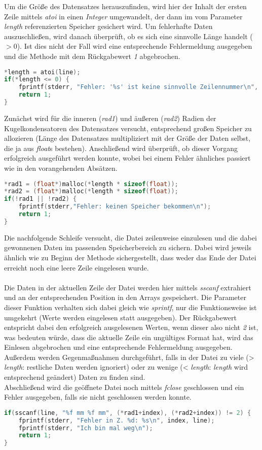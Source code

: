 \documentclass[11pt]{scrartcl}
\begin{document}
Um die Größe des Datensatzes herauszufinden, wird hier der Inhalt der ersten Zeile mittels \emph{atoi} in einen \emph{Integer} umgewandelt, der dann im vom Parameter \emph{length} referenzierten Speicher gesichert wird. Um fehlerhafte Daten auszuschließen, wird danach überprüft, ob es sich eine sinnvolle Länge handelt ($>0$). Ist dies nicht der Fall wird eine entsprechende Fehlermeldung ausgegeben und die Methode mit dem Rückgabewert \emph{1} abgebrochen.
\begin{lstlisting}[language=C]
*length = atoi(line);
if(*length <= 0) {
	fprintf(stderr, "Fehler: '%s' ist keine sinnvolle Zeilennummer\n", line);
	return 1;
}
\end{lstlisting}
Zunächst wird für die inneren (\emph{rad1}) und äußeren (\emph{rad2}) Radien der Kugelkondensatoren des Datensatzes versucht, entsprechend großen Speicher zu allozieren (Länge des Datensatzes multipliziert mit der Größe der Daten selbst, die ja aus \emph{float}s bestehen). Anschließend wird überprüft, ob dieser Vorgang erfolgreich ausgeführt werden konnte, wobei bei einem Fehler ähnliches passiert wie in den vorangehenden Absätzen.
\begin{lstlisting}[language=C]
*rad1 = (float*)malloc(*length * sizeof(float));
*rad2 = (float*)malloc(*length * sizeof(float));
if(!rad1 || !rad2) {
	fprintf(stderr,"Fehler: keinen Speicher bekommen\n");
	return 1;
}
\end{lstlisting}
Die nachfolgende Schleife versucht, die Datei zeilenweise einzulesen und die dabei gewonnenen Daten im passenden Speicherbereich zu sichern. Dabei wird jeweils ähnlich wie zu Beginn der Methode sichergestellt, dass weder das Ende der Datei erreicht noch eine leere Zeile eingelesen wurde.\\\\
Die Daten in der aktuellen Zeile der Datei werden hier mittels \emph{sscanf} extrahiert und an der entsprechenden Position in den Arrays gespeichert. Die Parameter dieser Funktion verhalten sich dabei gleich wie \emph{sprintf}, nur die Funktionsweise ist umgekehrt (Werte werden eingelesen statt ausgegeben). Der Rückgabewert entspricht dabei den erfolgreich ausgelesenen Werten, wenn dieser also nicht \emph{2} ist, was bedeuten würde, dass die aktuelle Zeile ein ungültiges Format hat, wird das Einlesen abgebrochen und eine entsprechende Fehlermeldung ausgegeben. Außerdem werden Gegenmaßnahmen durchgeführt, falls in der Datei zu viele (> \emph{length}: restliche Daten werden ignoriert) oder zu wenige (< \emph{length}: \emph{length} wird entsprechend geändert) Daten zu finden sind.\\
Abschließend wird die geöffnete Datei noch mittels \emph{fclose} geschlossen und ein Fehler ausgegeben, falls sie nicht geschlossen werden konnte.
\begin{lstlisting}[language=C]
if(sscanf(line, "%f mm %f mm", (*rad1+index), (*rad2+index)) != 2) {
	fprintf(stderr, "Fehler in Z. %d: %s\n", index, line);
	fprintf(stderr, "Ich bin mal weg\n");
	return 1;
}
\end{lstlisting}
\end{document}
